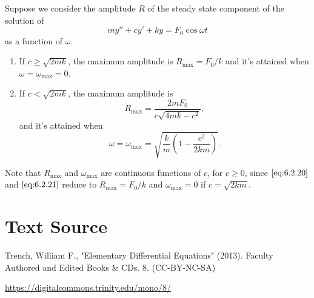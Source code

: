 \documentclass{ximera}
\begin{document}
 
\begin{theorem} \label{thmtype:6.2.1}
 Suppose we consider the amplitude $R$ of the steady state
component of the solution of
$$
my''+cy'+ky=F_0\cos\omega t
$$
as a function of $\omega$.
\begin{enumerate}
    \item
 If $c\geq\sqrt{2mk}$,  the maximum amplitude is
 $R_{\max}=F_0/k$ and it's attained when $\omega=
\omega_{\max}=0$.
\item
If $c<\sqrt{2mk}$, the maximum amplitude is
\begin{equation}\label{eq:6.2.20}
R_{\max}=\frac{2m F_0}{c\sqrt{4mk-c^2}},
\end{equation}
and it's attained when
\begin{equation}\label{eq:6.2.21}
\omega=\omega_{\max}=\sqrt{\frac{k}{m}\left(1-\frac{c^2}{2km}\right)}.
\end{equation}
\end{enumerate}
\end{theorem}
Note that $R_{\max}$ and $\omega_{\max}$ are continuous functions
of $c$, for $c\geq0$, since  $\eqref{eq:6.2.20}$ and  $\eqref{eq:6.2.21}$ reduce
to $R_{\max}=F_0/k$ and $\omega_{\max}=0$ if $c=\sqrt{2km}$.
 
 
\section*{Text Source}
Trench, William F., "Elementary Differential Equations" (2013). Faculty Authored and Edited Books \& CDs. 8. (CC-BY-NC-SA)
 
\href{https://digitalcommons.trinity.edu/mono/8/}{https://digitalcommons.trinity.edu/mono/8/}
 
\end{document}
